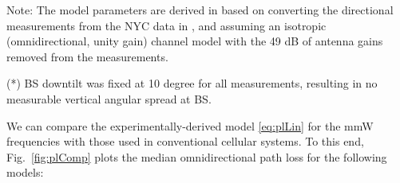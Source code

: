 \documentclass[journal]{IEEEtran}
\begin{document}
\begin{table*}
\begin{threeparttable}
\begin{tabular}{|>{\raggedright}p{1.5in}|>{\raggedright}p{2in}|
    >{\raggedright}p{1.25in}|>{\raggedright}p{1.25in}|}
  \end{tabular}
  \begin{tablenotes}
  \item Note:  The model parameters are derived in
\cite{AkLiuRanRapEr:13-arxiv} based on converting the directional measurements
from the NYC data in  \cite{rappaportmillimeter},
and assuming an isotropic (omnidirectional, unity gain) channel model
with the 49 dB of antenna gains removed from the measurements.
  \item (*) BS downtilt
was fixed at 10 degree for all measurements, resulting in no measurable vertical angular
spread at BS.
  \end{tablenotes}
  \end{threeparttable}
\end{table*}

We can compare the experimentally-derived model \eqref{eq:plLin} for the
mmW frequencies with those used in conventional cellular systems.
To this end, Fig.~\ref{fig:plComp} plots the median
omnidirectional path loss for the following models:
\end{document}
